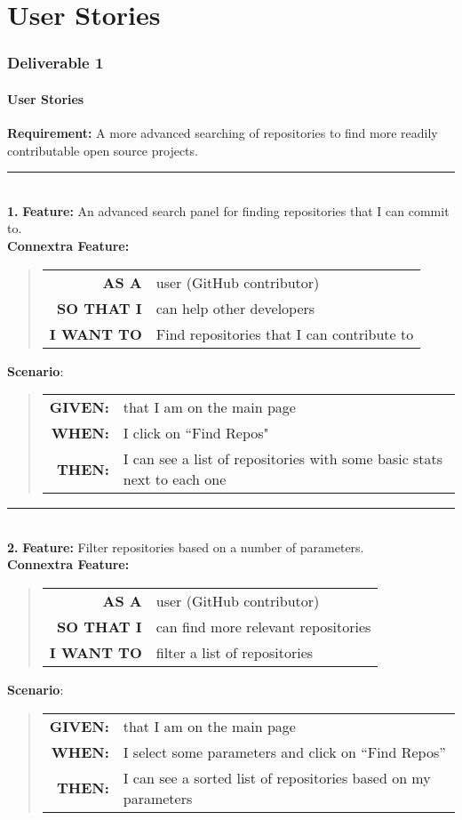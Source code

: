 \documentclass[12pt]{article}
\newcommand{\Requirement}[1] {
   \noindent \textbf{Requirement:} #1
}
\newcommand{\Feature}[1]{ 
   \noindent \textbf{Feature:} #1
}
\newcommand{\CFeature}[4]{
\noindent \textbf{Connextra Feature:}
	\begin{quote}
	\begin{tabular}{rl}
	\textbf{AS A} & #1\\
	\textbf{SO THAT \uppercase{#2}} & #3\\
	\textbf{\uppercase{#2} WANT TO} & #4  
	\end{tabular}
	\end{quote}
}
\newcommand{\GivenSc} {
	\noindent \textbf{GIVEN:}
	}
\newcommand{\WhenSc} {
	\noindent \textbf{WHEN:}
	}
\newcommand{\AndSc} {
	\noindent \textbf{AND:}
	}
\newcommand{\ThenSc} {
	\noindent \textbf{THEN:}
	}
\begin{document}


\pagebreak
\setcounter{part}{1}
\setcounter{section}{1}
\setcounter{subsection}{0}
\part{User Stories}
\section*{Deliverable 1}
\subsection{User Stories}


\begin{framed}
\Requirement{A more advanced searching of repositories to find more readily contributable open source projects.}\\[0.2cm]

\hrule~\\

\noindent  \textbf{1.}\Feature{An advanced search panel for finding repositories that I can commit to.}\\[0.2cm]


\CFeature{user (\textsf{GitHub} contributor)}{I}{can help other developers}{Find repositories that I can contribute to}

\noindent \textbf{Scenario}:
\begin{quote}
\begin{tabular}{rl}
\GivenSc & that I am on the main page\\
\WhenSc & I click on ``Find Repos"\\
\ThenSc & I can see a list of repositories with some basic stats next to each one
\end{tabular}
\end{quote}

\hrule~\\

\noindent  \textbf{2.}\Feature{Filter repositories based on a number of parameters.}\\[0.2cm]

\CFeature{user (\textsf{GitHub} contributor)}{I}{can find more relevant repositories}{filter a list of repositories}

\noindent \textbf{Scenario}:
\begin{quote}
\begin{tabular}{rl}
\GivenSc & that I am on the main page\\
\WhenSc & I select some parameters and click on ``Find Repos''\\
\ThenSc & I can see a sorted list of repositories based on my parameters
\end{tabular}
\end{quote}
\end{framed}
\end{document}
